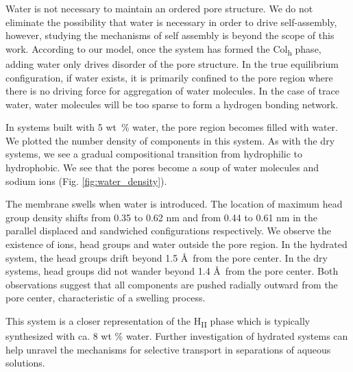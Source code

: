 \documentclass{article}
\begin{document}
  Water is not necessary to maintain an ordered pore structure. We do not
  eliminate the possibility that water is necessary in order to drive
  self-assembly, however, studying the mechanisms of self assembly is beyond the
  scope of this work. According to our model, once the system has formed the
  Col\textsubscript{h} phase, adding water only drives disorder of the pore
  structure. In the true equilibrium configuration, if water exists, it is
  primarily confined to the pore region where there is no driving force for
  aggregation of water molecules. In the case of trace water, water molecules
  will be too sparse to form a hydrogen bonding network.

  In systems built with 5 wt~\% water, the pore region becomes filled with
  water. We plotted the number density of components in this system. As with the 
  dry systems, we see a gradual compositional transition from hydrophilic to hydrophobic.  
  We see that the pores become a soup of water molecules and sodium ions (Fig.
  \ref{fig:water_density}). 

  The membrane swells when water is introduced. The location of maximum head
  group density shifts from 0.35 to 0.62 nm and from 0.44 to 0.61 nm in the
  parallel displaced and sandwiched configurations respectively.  We observe the
  existence of ions, head groups and water outside the pore region. In the
  hydrated system, the head groups drift beyond 1.5 \AA~from the pore center. In
  the dry systems, head groups did not wander beyond 1.4 \AA~from the pore
  center. Both observations suggest that all components are pushed radially
  outward from the pore center, characteristic of a swelling process. 
   
  This system is a closer representation of the H\textsubscript{II} phase which
  is typically synthesized with ca. 8 wt \% water. Further investigation of
  hydrated systems can help unravel the mechanisms for selective transport in
  separations of aqueous solutions. 
\end{document}

